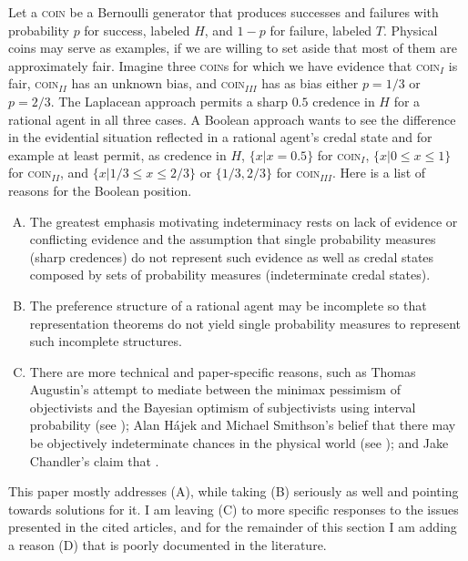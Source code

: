 Let a \textsc{coin} be a Bernoulli generator that
produces successes and failures with probability $p$
for success, labeled $H$, and $1-p$ for failure,
labeled $T$. Physical coins may serve as examples, if
we are willing to set aside that most of them are
approximately fair. Imagine three \textsc{coin}s for
which we have evidence that \textsc{coin}$_{I}$ is
fair, \textsc{coin}$_{II}$ has an unknown bias, and
\textsc{coin}$_{III}$ has as bias either $p=1/3$ or
$p=2/3$. The Laplacean approach permits a sharp $0.5$
credence in $H$ for a rational agent in all three
cases. A Boolean approach wants to see the difference
in the evidential situation reflected in a rational
agent's credal state and for example at least permit,
as credence in $H$, $\{x|x=0.5\}$ for
\textsc{coin}$_{I}$, $\{x|0\leq{}x\leq{}1\}$ for
\textsc{coin}$_{II}$, and $\{x|1/3\leq{}x\leq{}2/3\}$
or $\{1/3,2/3\}$ for \textsc{coin}$_{III}$. Here is a
list of reasons for the Boolean position.

\begin{enumerate}[(A)]
\item The greatest emphasis motivating indeterminacy
  rests on lack of evidence or conflicting evidence and
  the assumption that single probability measures
  (sharp credences) do not represent such evidence as
  well as credal states composed by sets of probability
  measures (indeterminate credal states).
\item The preference structure of a rational agent may
  be incomplete so that representation theorems do not
  yield single probability measures to represent such
  incomplete structures.
\item There are more technical and paper-specific
  reasons, such as Thomas Augustin's attempt to mediate
  between the minimax pessimism of objectivists and the
  Bayesian optimism of subjectivists using interval
  probability (see ); Alan
  H{\'a}jek and Michael Smithson's belief that there
  may be objectively indeterminate chances in the
  physical world (see );
  and Jake Chandler's claim that  .
\end{enumerate}

This paper mostly addresses (A), while taking (B)
seriously as well and pointing towards solutions for
it. I am leaving (C) to more specific responses to the
issues presented in the cited articles, and for the
remainder of this section I am adding a reason (D) that
is poorly documented in the literature.

